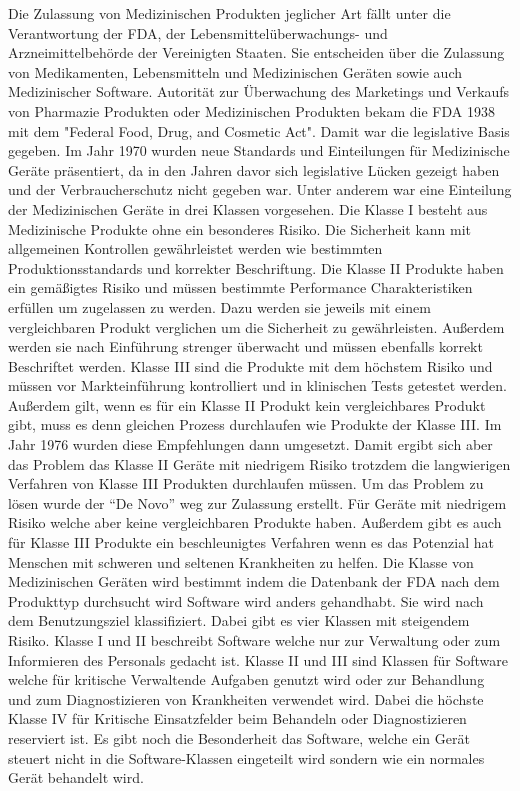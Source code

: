 Die Zulassung von Medizinischen Produkten jeglicher Art fällt unter die Verantwortung der FDA, der Lebensmittelüberwachungs- und Arzneimittelbehörde  der Vereinigten Staaten. Sie entscheiden über die Zulassung von Medikamenten, Lebensmitteln und Medizinischen Geräten sowie auch Medizinischer Software. Autorität zur Überwachung des Marketings und Verkaufs von Pharmazie Produkten oder Medizinischen Produkten bekam die FDA 1938 mit dem "Federal Food, Drug, and Cosmetic Act". Damit war die legislative Basis gegeben. Im Jahr 1970 wurden neue Standards und Einteilungen für Medizinische Geräte präsentiert, da in den Jahren davor sich legislative Lücken gezeigt haben und der Verbraucherschutz nicht gegeben war. Unter anderem war eine Einteilung der Medizinischen Geräte in drei Klassen vorgesehen. Die Klasse I besteht aus Medizinische Produkte ohne ein besonderes Risiko. Die Sicherheit kann mit allgemeinen Kontrollen gewährleistet werden wie bestimmten Produktionsstandards und korrekter Beschriftung. Die Klasse II Produkte haben ein gemäßigtes Risiko und müssen bestimmte Performance Charakteristiken erfüllen um zugelassen zu werden. Dazu werden sie jeweils mit einem vergleichbaren Produkt verglichen um die Sicherheit zu gewährleisten. Außerdem werden sie nach Einführung strenger überwacht und müssen ebenfalls korrekt Beschriftet werden. Klasse III sind die Produkte mit dem höchstem Risiko und müssen vor Markteinführung kontrolliert und in klinischen Tests getestet werden. Außerdem gilt, wenn es für ein Klasse II Produkt kein vergleichbares Produkt gibt, muss es denn gleichen Prozess durchlaufen wie Produkte der Klasse III. Im Jahr 1976 wurden diese Empfehlungen dann umgesetzt. Damit ergibt sich aber das Problem das Klasse II Geräte mit niedrigem Risiko trotzdem die langwierigen Verfahren von Klasse III Produkten durchlaufen müssen. Um das Problem zu lösen wurde der "`De Novo"'\cite{usa_ai_approval} weg zur Zulassung erstellt. Für Geräte mit niedrigem Risiko welche aber keine vergleichbaren Produkte haben. Außerdem gibt es auch für Klasse III Produkte ein beschleunigtes Verfahren wenn es das Potenzial hat Menschen mit schweren und seltenen Krankheiten zu helfen. Die Klasse von Medizinischen Geräten wird bestimmt indem die Datenbank der FDA nach dem Produkttyp durchsucht wird \linebreak Software wird anders gehandhabt. Sie wird nach dem Benutzungsziel klassifiziert. Dabei gibt es vier Klassen mit steigendem Risiko. Klasse I und II beschreibt Software welche nur zur Verwaltung oder zum Informieren des Personals gedacht ist. Klasse II und III sind Klassen für Software welche für kritische Verwaltende Aufgaben genutzt wird oder zur Behandlung und zum Diagnostizieren von Krankheiten verwendet wird. Dabei die höchste Klasse IV für Kritische Einsatzfelder beim Behandeln oder Diagnostizieren reserviert ist. Es gibt noch die Besonderheit das Software, welche ein Gerät steuert nicht in die Software-Klassen eingeteilt wird sondern wie ein normales Gerät behandelt wird. \cite{usa_ai_approval}